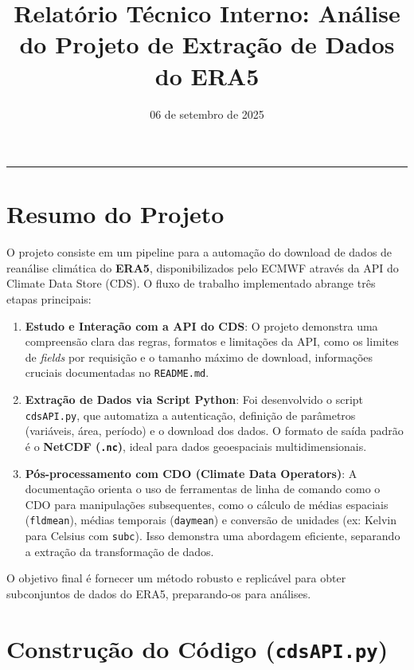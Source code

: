 \documentclass[12pt, a4paper]{article}
\title{\textbf{Relatório Técnico Interno: Análise do Projeto de Extração de Dados do ERA5}}
\date{06 de setembro de 2025}
\begin{document}
\maketitle


\hrule
\vspace{12pt}

\section{Resumo do Projeto}

O projeto consiste em um pipeline para a automação do download de dados de reanálise climática do \textbf{ERA5}, disponibilizados pelo ECMWF através da API do Climate Data Store (CDS). O fluxo de trabalho implementado abrange três etapas principais:

\begin{enumerate}
    \item \textbf{Estudo e Interação com a API do CDS}: O projeto demonstra uma compreensão clara das regras, formatos e limitações da API, como os limites de \textit{fields} por requisição e o tamanho máximo de download, informações cruciais documentadas no \texttt{README.md}.

    \item \textbf{Extração de Dados via Script Python}: Foi desenvolvido o script \texttt{cdsAPI.py}, que automatiza a autenticação, definição de parâmetros (variáveis, área, período) e o download dos dados. O formato de saída padrão é o \textbf{NetCDF (\texttt{.nc})}, ideal para dados geoespaciais multidimensionais.

    \item \textbf{Pós-processamento com CDO (Climate Data Operators)}: A documentação orienta o uso de ferramentas de linha de comando como o CDO para manipulações subsequentes, como o cálculo de médias espaciais (\texttt{fldmean}), médias temporais (\texttt{daymean}) e conversão de unidades (ex: Kelvin para Celsius com \texttt{subc}). Isso demonstra uma abordagem eficiente, separando a extração da transformação de dados.
\end{enumerate}

O objetivo final é fornecer um método robusto e replicável para obter subconjuntos de dados do ERA5, preparando-os para análises.

\section{Construção do Código (\texttt{cdsAPI.py})}
\end{document}
